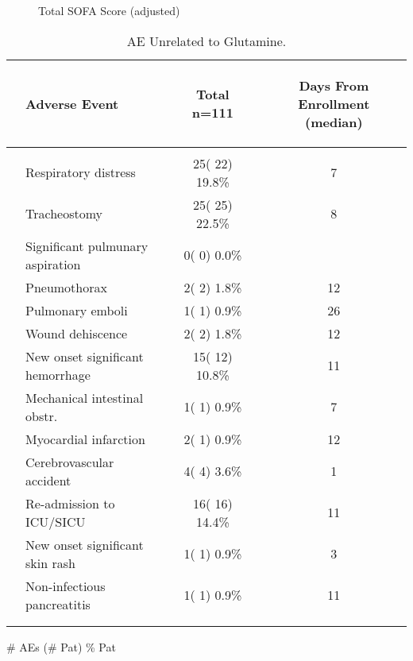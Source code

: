 \documentclass[dvips,10pt]{article}
\begin{document}
\begin{figure}
\caption{Total SOFA Score (adjusted)}
\end{figure}
\clearpage
\begin{table}[t]
\caption
{ AE Unrelated to Glutamine. }
\begin{center}
\begin{tabular}{ @{}l@{}
@{}l@{}@{}p{1.5em}@{}@{}c@{}@{}p{1.5em}@{}@{}c@{}
}
\hline

& \parbox{6em}{\begin{center}Adverse Event\end{center}} && \parbox{6em}{\begin{center}Total n=111\end{center}} && \parbox{6em}{\begin{center}Days From Enrollment  (median)\end{center}} \\

\hline

\\
& Respiratory distress && 25( 22) 19.8\% && 7 \\
& Tracheostomy && 25( 25) 22.5\% && 8 \\
& Significant pulmunary aspiration && 0(  0)  0.0\% &&  \\
& Pneumothorax && 2(  2)  1.8\% && 12 \\
& Pulmonary emboli && 1(  1)  0.9\% && 26 \\
& Wound dehiscence && 2(  2)  1.8\% && 12 \\
& New onset significant hemorrhage && 15( 12) 10.8\% && 11 \\
& 
Mechanical intestinal obstr. && 1(  1)  0.9\% && 7 \\
& Myocardial infarction && 2(  1)  0.9\% && 12 \\
& Cerebrovascular accident && 4(  4)  3.6\% && 1 \\
& Re-admission to ICU/SICU && 16( 16) 14.4\% && 11 \\
& New onset significant skin rash && 1(  1)  0.9\% && 3 \\
& 
Non-infectious pancreatitis && 1(  1)  0.9\% && 11 \\
\\
\hline \\

\end{tabular}


\parbox{ 5in }{ \# AEs (\# Pat) \% Pat } \\
 \vspace{1em}\end{center}
 \end{table}
\end{document}
